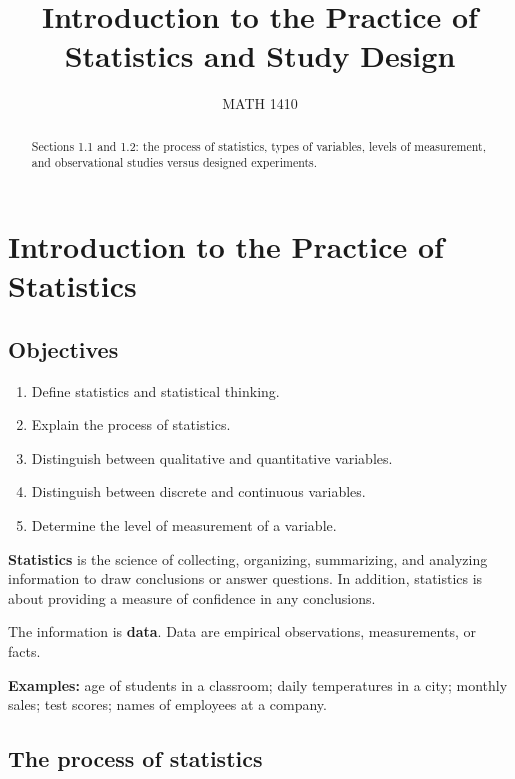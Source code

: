 \documentclass{ximera}
\title{Introduction to the Practice of Statistics and Study Design}
\author{MATH 1410}
\begin{document}
\begin{abstract}
Sections 1.1 and 1.2: the process of statistics, types of variables, levels of measurement, and observational studies versus designed experiments.
\end{abstract}
\maketitle

\section{Introduction to the Practice of Statistics}

\subsection*{Objectives}
\begin{enumerate}
  \item Define statistics and statistical thinking.
  \item Explain the process of statistics.
  \item Distinguish between qualitative and quantitative variables.
  \item Distinguish between discrete and continuous variables.
  \item Determine the level of measurement of a variable.
\end{enumerate}

\begin{definition}
\textbf{Statistics} is the science of collecting, organizing, summarizing, and analyzing information to draw conclusions or answer questions. In addition, statistics is about providing a measure of confidence in any conclusions.
\end{definition}

The information is \textbf{data}. Data are empirical observations, measurements, or facts.

\textbf{Examples:} age of students in a classroom; daily temperatures in a city; monthly sales; test scores; names of employees at a company.

\subsection*{The process of statistics}
\end{document}
